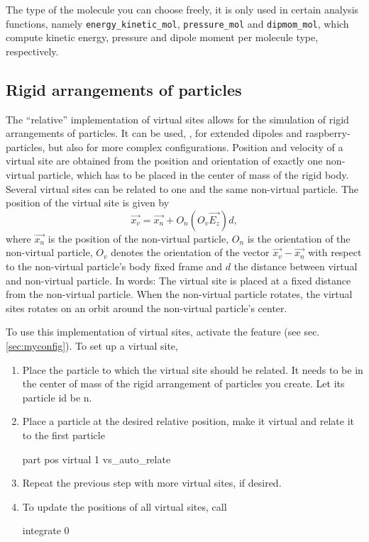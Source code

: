The type of the molecule you can choose freely, it is only used in
certain analysis functions, namely \texttt{energy_kinetic_mol},
\texttt{pressure_mol} and \texttt{dipmom_mol}, which compute kinetic
energy, pressure and dipole moment per molecule type, respectively.


\subsection{Rigid arrangements of particles}

The ``relative'' implementation of virtual sites allows for the
simulation of rigid arrangements of particles. It can be used, \eg,
for extended dipoles and raspberry-particles, but also for more
complex configurations.  Position and velocity of a virtual site are
obtained from the position and orientation of exactly one non-virtual
particle, which has to be placed in the center of mass of the rigid
body. Several virtual sites can be related to one and the same
non-virtual particle.  The position of the virtual site is given by
\begin{equation}
\vec{x_v} =\vec{x_n} +O_n (O_v \vec{E_z}) d,
\end{equation}
where $\vec{x_n}$ is the position of the non-virtual particle, $O_n$
is the orientation of the non-virtual particle, $O_v$ denotes the
orientation of the vector $\vec{x_v}-\vec{x_n}$ with respect to the
non-virtual particle's body fixed frame and $d$ the distance between
virtual and non-virtual particle.  In words: The virtual site is
placed at a fixed distance from the non-virtual particle. When the
non-virtual particle rotates, the virtual sites rotates on an orbit
around the non-virtual particle's center.

To use this implementation of virtual sites, activate the feature
 (see sec. \ref{sec:myconfig}).  To
set up a virtual site,
\begin{enumerate}
\item Place the particle to which the virtual site should be
  related. It needs to be in the center of mass of the rigid
  arrangement of particles you create. Let its particle id be n.
\item Place a particle at the desired relative position, make it
  virtual and relate it to the first particle
  \begin{essyntaxbox}
    part  pos  virtual 1 vs_auto_relate 
  \end{essyntaxbox}
\item Repeat the previous step with more virtual sites, if desired.
\item To update the positions of all virtual sites, call
  \begin{essyntaxbox}
    integrate 0
  \end{essyntaxbox}
\end{enumerate}

